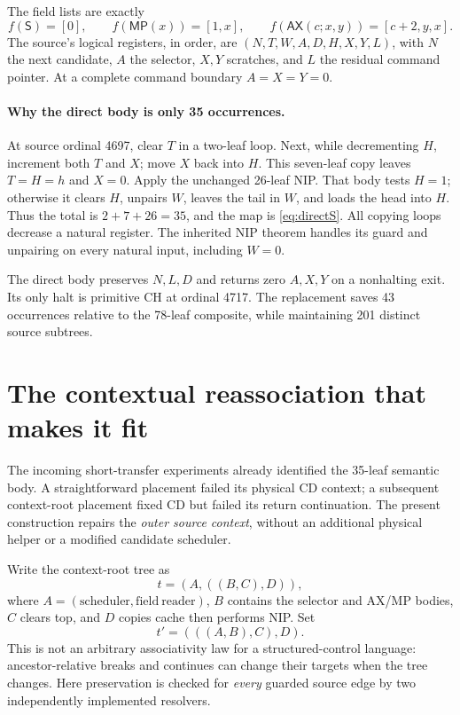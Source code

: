 \documentclass[11pt]{article}
\newcommand{\AX}{\mathsf{AX}}
\newcommand{\MP}{\mathsf{MP}}
\newcommand{\Tr}{\mathsf S}
\begin{document}
The field lists are exactly
\[
 f(\Tr)=[0],\qquad f(\MP(x))=[1,x],\qquad
 f(\AX(c;x,y))=[c+2,y,x].
\]
The source's logical registers, in order, are
$(N,T,W,A,D,H,X,Y,L)$, with $N$ the next candidate, $A$ the
selector, $X,Y$ scratches, and $L$ the residual command pointer.
At a complete command boundary $A=X=Y=0$.

\paragraph{Why the direct body is only 35 occurrences.}
At source ordinal 4697, clear $T$ in a two-leaf loop. Next, while
decrementing $H$, increment both $T$ and $X$; move $X$ back into
$H$. This seven-leaf copy leaves $T=H=h$ and $X=0$. Apply the
unchanged 26-leaf NIP. That body tests $H=1$; otherwise it clears
$H$, unpairs $W$, leaves the tail in $W$, and loads the head into
$H$. Thus the total is $2+7+26=35$, and the map is
\eqref{eq:directS}. All copying loops decrease a natural register.
The inherited NIP theorem handles its guard and unpairing on every
natural input, including $W=0$.

The direct body preserves $N,L,D$ and returns zero $A,X,Y$ on a
nonhalting exit. Its only halt is primitive CH at ordinal 4717.
The replacement saves 43 occurrences relative to the 78-leaf
composite, while maintaining 201 distinct source subtrees.

\section{The contextual reassociation that makes it fit}
\label{sec:rotation}

The incoming short-transfer experiments already identified the
35-leaf semantic body. A straightforward placement failed its
physical CD context; a subsequent context-root placement fixed
CD but failed its return continuation. The present construction
repairs the \emph{outer source context}, without an additional
physical helper or a modified candidate scheduler.

Write the context-root tree as
\[
 t=(A,((B,C),D)),
\]
where $A=(\mathrm{scheduler},\mathrm{field\ reader})$, $B$ contains
the selector and AX/MP bodies, $C$ clears top, and $D$ copies cache
then performs NIP. Set
\begin{equation}
                  t'=(((A,B),C),D).
 \label{eq:rotation}
\end{equation}
This is not an arbitrary associativity law for a structured-control
language: ancestor-relative breaks and continues can change their
targets when the tree changes. Here preservation is checked for
\emph{every} guarded source edge by two independently implemented
resolvers.
\end{document}
